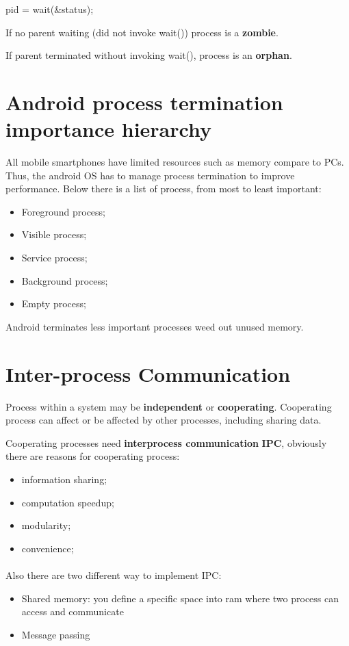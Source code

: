 \begin{codeInC}
pid  = wait(&status);
\end{codeInC}

If no parent waiting (did not invoke wait()) process is a \textbf{zombie}.

If parent terminated without invoking wait(), process is an \textbf{orphan}.



\section{Android process termination importance hierarchy}
All mobile smartphones have limited resources such as memory compare to PCs. Thus, the android OS has to manage process termination to improve performance. Below there is a list of process, from most to least important: 

\begin{itemize}
    \item Foreground process;
    \item Visible process;
    \item Service process;
    \item Background process;
    \item Empty process;
\end{itemize}

Android terminates less important processes weed out unused memory. 

\section{Inter-process Communication}

Process within a system may be \textbf{independent} or \textbf{cooperating}.
Cooperating process can affect or be affected by other processes, including sharing data.

Cooperating processes need \textbf{interprocess communication} \textbf{IPC}, obviously there are reasons for cooperating process:

\begin{itemize}
    \item information sharing;
    \item computation speedup;
    \item modularity;
    \item convenience;
\end{itemize}

\paragraph{}
Also there are two different way to implement IPC: 
\begin{itemize}
    \item Shared memory: you define a specific space into ram where two process can access and communicate
    \item Message passing
\end{itemize}

